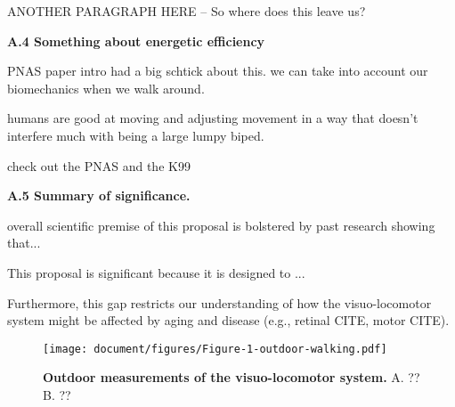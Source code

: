 ANOTHER PARAGRAPH HERE -- So where does this leave us?


\textbf{A.4 Something about energetic efficiency}

PNAS paper intro had a big schtick about this.  
we can take into account our biomechanics when we walk around.

humans are good at moving and adjusting movement in a way that doesn't interfere much with being a large lumpy biped.

check out the PNAS and the K99

\textbf{A.5 Summary of significance.} 

overall scientific premise of this proposal is bolstered by past research showing that...

This proposal is significant because it is designed to ...




  Furthermore, this gap restricts our understanding of how the visuo-locomotor system might be affected by aging and disease (e.g., retinal CITE, motor CITE).  



\begin{figure}[h]
\centering
\texttt{[image: document/figures/Figure-1-outdoor-walking.pdf]}
\caption{\textbf{Outdoor measurements of the visuo-locomotor system.} A. ?? B. ??}
\end{figure}
